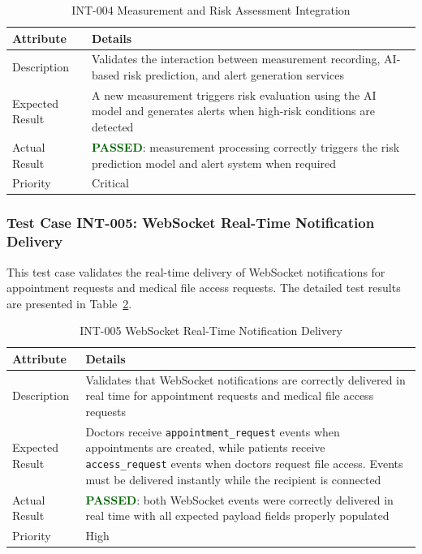 \begin{table}[H]
\centering
\caption{INT-004 Measurement and Risk Assessment Integration}
\label{tab:int004}
\renewcommand{\arraystretch}{1.3}

\begin{tabular}{|p{2cm}|p{13cm}|}
\hline
\rowcolor{blue!10}
\textbf{Attribute} & \textbf{Details} \\
\hline
Description & Validates the interaction between measurement recording, AI-based risk prediction, and alert generation services \\
\hline
Expected Result & A new measurement triggers risk evaluation using the AI model and generates alerts when high-risk conditions are detected \\
\hline
Actual Result & \textbf{\textcolor{darkgreen}{PASSED}}: measurement processing correctly triggers the risk prediction model and alert system when required \\
\hline
Priority & Critical \\
\hline
\end{tabular}
\end{table}

\subsubsection{Test Case INT-005: WebSocket Real-Time Notification Delivery}

This test case validates the real-time delivery of WebSocket notifications for appointment requests and medical file access requests. The detailed test results are presented in Table~\ref{tab:int005}.

\begin{table}[H]
\centering
\caption{INT-005 WebSocket Real-Time Notification Delivery}
\label{tab:int005}
\renewcommand{\arraystretch}{1.3}

\begin{tabular}{|p{2cm}|p{13cm}|}
\hline
\rowcolor{blue!10}
\textbf{Attribute} & \textbf{Details} \\
\hline
Description & Validates that WebSocket notifications are correctly delivered in real time for appointment requests and medical file access requests \\
\hline
Expected Result & Doctors receive \texttt{appointment\_request} events when appointments are created, while patients receive \texttt{access\_request} events when doctors request file access. Events must be delivered instantly while the recipient is connected \\
\hline
Actual Result & \textbf{\textcolor{darkgreen}{PASSED}}: both WebSocket events were correctly delivered in real time with all expected payload fields properly populated \\
\hline
Priority & High \\
\hline
\end{tabular}
\end{table}

